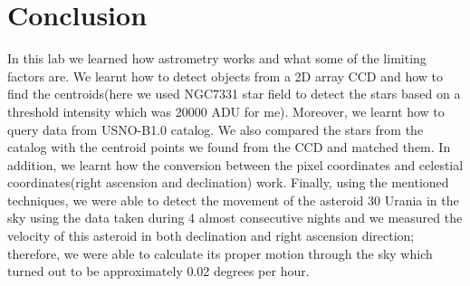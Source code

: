 \documentclass[letterpaper,12pt]{article}
\begin{document}
\section{Conclusion}
\label{sec:conclusion}
In this lab we learned how astrometry works and what some of the limiting factors are. We learnt how to detect objects from a 2D array CCD and how to find the centroids(here we used NGC7331 star field to detect the stars based on a threshold intensity which was 20000 ADU for me). Moreover, we learnt how to query data from USNO-B1.0 catalog. We also compared the stars from the catalog with the centroid points we found from the CCD and matched them. In addition, we learnt how the conversion between the pixel coordinates and celestial coordinates(right ascension and declination) work. Finally, using the mentioned techniques, we were able to detect the movement of the asteroid 30 Urania in the sky using the data taken during 4 almost consecutive nights and we measured the velocity of this asteroid in both declination and right ascension direction; therefore, we were able to calculate its proper motion through the sky which turned out to be approximately 0.02 degrees per hour.                                                                                                                                                                                                                                                                                                                                                                                                                                                                                                                                                                                                                                                                                                                                                                                                                                                                                                                                                                                                                                                                                                                                                                                                                                                                                                                                                                                                                                                                                                                                                                                                                                                                                                                                                                                                                                                                                                                                                                                                                                                                                                                                                                                  
\end{document}
